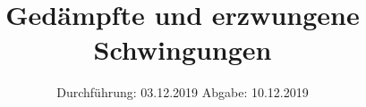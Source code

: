 

\subject{Versuch 354}
\title{Gedämpfte und erzwungene Schwingungen}
\date{%
  Durchführung: 03.12.2019
  \hspace{3em}
  Abgabe: 10.12.2019
}



\maketitle
\thispagestyle{empty}
\tableofcontents
\newpage









\printbibliography{}


